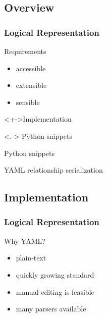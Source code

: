 \documentclass[
]{beamer}
\begin{document}
\subsection{Overview}
\begin{frame}
  \frametitle{Logical Representation}
  \begin{block}{Requirements}
    \begin{itemize}[<+->]
    \item accessible
    \item extensible
    \item sensible
    \end{itemize}
  \end{block}
  \begin{block}<+->{Implementation}
    \begin{description}[<+->]
    \item[predicates]<.-> Python snippets
    \item[moves] Python snippets
    \item[algorithms] \alert<+->{YAML} relationship serialization
    \end{description}
  \end{block}
\end{frame}

\subsection{Implementation}
\begin{frame}
  \frametitle{Logical Representation}
  \begin{block}{Why YAML?}
    \begin{itemize}[<+->]
    \item plain-text
    \item quickly growing standard
    \item manual editing is feasible
    \item many parsers available
    \end{itemize}
  \end{block}
\end{frame}
\end{document}
